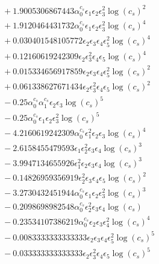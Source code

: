 \documentclass[10pt]{article}
\begin{document}
\begin{align*}
&{}  + 1.9005306867443 \alpha_{0}^{c_s} \epsilon_{1} \epsilon_{2} \epsilon_{3}^{2} \log{\left(c_{s} \right)}^{2} \\
&{}  + 1.9120464431732 \alpha_{0}^{c_s} \epsilon_{1} \epsilon_{2} \epsilon_{3}^{2} \log{\left(c_{s} \right)}^{4} \\
&{}  + 0.030401548105772 \epsilon_{2} \epsilon_{3} \epsilon_{4} \epsilon_{5}^{2} \log{\left(c_{s} \right)}^{4} \\
&{}  + 0.12160619242309 \epsilon_{2} \epsilon_{3}^{2} \epsilon_{4} \epsilon_{5} \log{\left(c_{s} \right)}^{4} \\
&{}  + 0.015334656917859 \epsilon_{2} \epsilon_{3} \epsilon_{4} \epsilon_{5}^{2} \log{\left(c_{s} \right)}^{2} \\
&{}  + 0.061338627671434 \epsilon_{2} \epsilon_{3}^{2} \epsilon_{4} \epsilon_{5} \log{\left(c_{s} \right)}^{2} \\
&{}  - 0.25 \alpha_{0}^{c_s} \alpha_{1}^{c_s} \epsilon_{2} \epsilon_{3} \log{\left(c_{s} \right)}^{5} \\
&{}  - 0.25 \alpha_{0}^{c_s} \epsilon_{1} \epsilon_{2} \epsilon_{3}^{2} \log{\left(c_{s} \right)}^{5} \\
&{}  - 4.2160619242309 \alpha_{0}^{c_s} \epsilon_{1}^{2} \epsilon_{2} \epsilon_{3} \log{\left(c_{s} \right)}^{4} \\
&{}  - 2.6158455479593 \epsilon_{1} \epsilon_{2}^{2} \epsilon_{3} \epsilon_{4} \log{\left(c_{s} \right)}^{3} \\
&{}  - 3.9947134655926 \epsilon_{1}^{2} \epsilon_{2} \epsilon_{3} \epsilon_{4} \log{\left(c_{s} \right)}^{3} \\
&{}  - 0.14826959356919 \epsilon_{2}^{2} \epsilon_{3} \epsilon_{4} \epsilon_{5} \log{\left(c_{s} \right)}^{2} \\
&{}  - 3.2730432451944 \alpha_{0}^{c_s} \epsilon_{1} \epsilon_{2} \epsilon_{3}^{2} \log{\left(c_{s} \right)}^{3} \\
&{}  - 0.2098698982548 \alpha_{0}^{c_s} \epsilon_{2}^{2} \epsilon_{3} \epsilon_{4} \log{\left(c_{s} \right)} \\
&{}  - 0.23534107386219 \alpha_{0}^{c_s} \epsilon_{2} \epsilon_{3} \epsilon_{4}^{2} \log{\left(c_{s} \right)}^{4} \\
&{}  - 0.0083333333333333 \epsilon_{2} \epsilon_{3} \epsilon_{4} \epsilon_{5}^{2} \log{\left(c_{s} \right)}^{5} \\
&{}  - 0.033333333333333 \epsilon_{2} \epsilon_{3}^{2} \epsilon_{4} \epsilon_{5} \log{\left(c_{s} \right)}^{5} \\

\end{align*}
\end{document}
